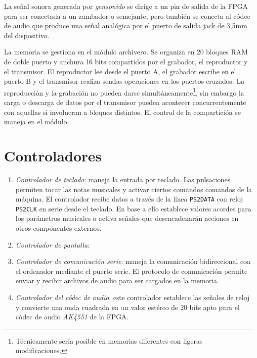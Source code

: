 \documentclass{article}
\begin{document}
	\medskip La señal sonora generada por {\itshape gensonido} se dirige a un pin de salida de la FPGA para ser conectada a un zumbador o semejante, pero también se conecta al códec de audio que produce una señal analógica por el puerto de salida jack de 3,5mm del dispositivo.

	\medskip La memoria se gestiona en el módulo archivero. Se organiza en 20 bloques RAM de doble puerto y anchura 16 bits compartidos por el grabador, el reproductor y el transmisor. El reproductor lee desde el puerto A, el grabador escribe en el puerto B y el transmisor realiza sendas operaciones en los puertos cruzados. La reproducción y la grabación no pueden darse simultáneamente\footnote{Técnicamente sería posible en memorias diferentes con ligeras modificaciones.}, sin embargo la carga o descarga de datos por el transmisor pueden acontecer concurrentemente con aquellas si involucran a bloques distintos. El control de la compartición se maneja en el módulo.

\section{Controladores}

\begin{enumerate}
	\item {\itshape Controlador de teclado}: maneja la entrada por teclado. Las pulsaciones permiten tocar las notas musicales y activar ciertos comandos comandos de la máquina. El controlador recibe datos a través de la línea \verb|PS2DATA| con reloj \verb|PS2CLK| en serie desde el teclado. En base a ello establece valores acordes para los parámetros musicales o activa señales que desencadenarán acciones en otros componentes externos.
	\item {\itshape Controlador de pantalla}:
	\item {\itshape Controlador de comunicación serie}: maneja la comunicación bidireccional con el ordenador mediante el puerto serie. El protocolo de comunicación permite enviar y recibir archivos de audio para ser cargados en la memoria.
	\item {\itshape Controlador del códec de audio}: este controlador establece las señales de reloj y convierte una onda cuadrada en un valor estéreo de 20 bits apto para el códec de audio {\itshape AK4551} de la FPGA.
\end{enumerate}
\end{document}

